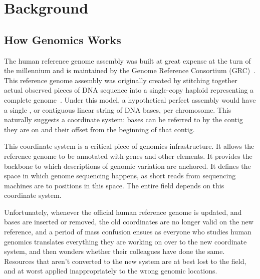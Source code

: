 \section{Background}

\subsection{How Genomics Works}

The human reference genome assembly was built at great expense at the turn of the millennium and is maintained by the Genome Reference Consortium (GRC)~\cite{church2011modernizing}. This reference genome assembly was originally created by stitching together actual observed pieces of DNA sequence into a single-copy haploid  representing a complete genome~\cite{church2011modernizing}. Under this model, a hypothetical perfect assembly would have a single , or contiguous linear string of DNA bases, per chromosome. This naturally suggests a coordinate system: bases can be referred to by the contig they are on and their offset from the beginning of that contig.

This coordinate system is a critical piece of genomics infrastructure. It allows the reference genome to be annotated with genes and other elements. It provides the backbone to which descriptions of genomic variation are anchored. It defines the space in which genome sequencing happens, as short reads from sequencing machines are  to positions in this space. The entire field depends on this coordinate system.

Unfortunately, whenever the official human reference genome is updated, and bases are inserted or removed, the old coordinates are no longer valid on the new reference, and a period of mass confusion ensues as everyone who studies human genomics translates everything they are working on over to the new coordinate system, and then wonders whether their colleagues have done the same. Resources that aren't converted to the new system are at best lost to the field, and at worst applied inappropriately to the wrong genomic locations.

